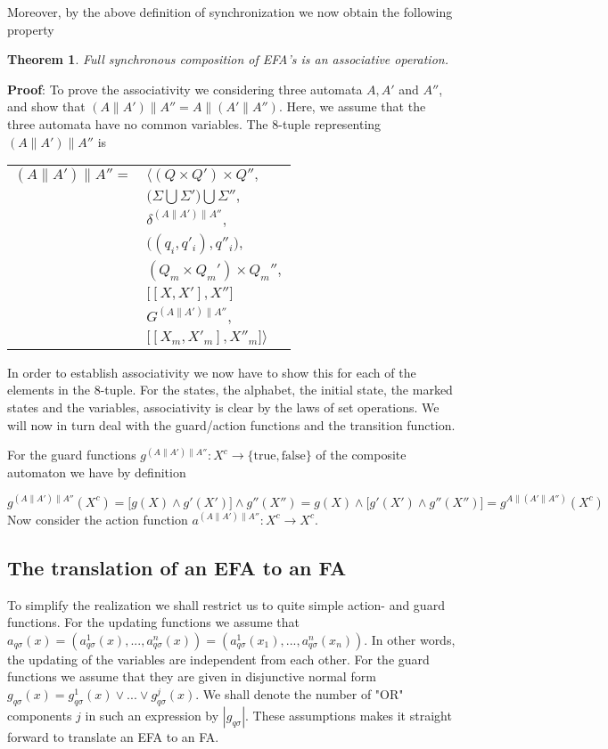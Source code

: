 \documentclass{article}
\newtheorem{theorem}{Theorem}
\begin{document}
Moreover, by the above definition of synchronization we now obtain
the following property

\begin{theorem}
   Full synchronous composition of EFA's is an associative
   operation.
\end{theorem}

\noindent \textbf{Proof}: To prove the associativity we
considering three automata $A, A'$ and $A''$, and show that
$(A\|A')\|A'' = A\|(A'\|A'')$. Here, we assume that the three
automata have no common variables.
\newline\newline
\noindent The 8-tuple representing $(A\|A')\|A''$ is
\begin{center}
\begin{tabular}{ll}
  $(A\|A')\|A'' =$ & $\Big \langle (Q \times Q') \times Q'',$\\
  & $ \big(\Sigma \bigcup \Sigma' \big) \bigcup \Sigma'',$\\
  & $\delta^{(A\|A')\|A''},$\\
  & $\big((q_i, q'_i) , q''_i\big),$\\
  & $(Q_m \times Q_m') \times Q_m'',$\\
  & $\big[[X, X'], X'']$\\
  & $G^{(A\|A')\|A''},$\\
  & $\big[[X_m, X'_m], X''_m \big] \Big \rangle$
\end{tabular}
\end{center}

\noindent In order to establish associativity we now have to show
this for each of the elements in the 8-tuple. For the states, the
alphabet, the initial state, the marked states and the variables,
associativity is clear by the laws of set operations. We will now
in turn deal with the guard/action functions and the transition
function.

For the guard functions $g^{(A\|A')\|A''} : X^c \rightarrow
\{\mathrm{true}, \mathrm{false}\}$ of the composite automaton we
have by definition

\begin{equation}
  g^{(A\|A')\|A''}(X^c) = \big[g(X) \wedge g'(X') \big] \wedge g''(X'') = g(X) \wedge \big[g'(X') \wedge g''(X'')] = g^{A\|(A'\|A'')}(X^c)
\end{equation}
\noindent Now consider the action function $a^{(A\|A')\|A''} : X^c
\rightarrow X^c$.
\newpage
\subsection{The translation of an EFA to  an FA}
To simplify the realization we shall restrict us to quite simple
action- and guard functions. For the updating functions we assume
that $a_{q \sigma}(x)=(a^1_{q \sigma}(x),...,a^n_{q
\sigma}(x))=(a^1_{q \sigma}(x_1),...,a^n_{q \sigma}(x_n))$. In
other words, the updating of the variables are independent from
each other. For the guard functions we assume that they are given
in disjunctive normal form $g_{q \sigma}(x)=g^1_{q \sigma}(x)\vee
...\vee g^j_{q \sigma}(x)$. We shall denote the number of "OR"
components $j$ in such an expression by $|g_{q \sigma}|$. These
assumptions makes it straight forward to translate an EFA to an
FA.
\end{document}
